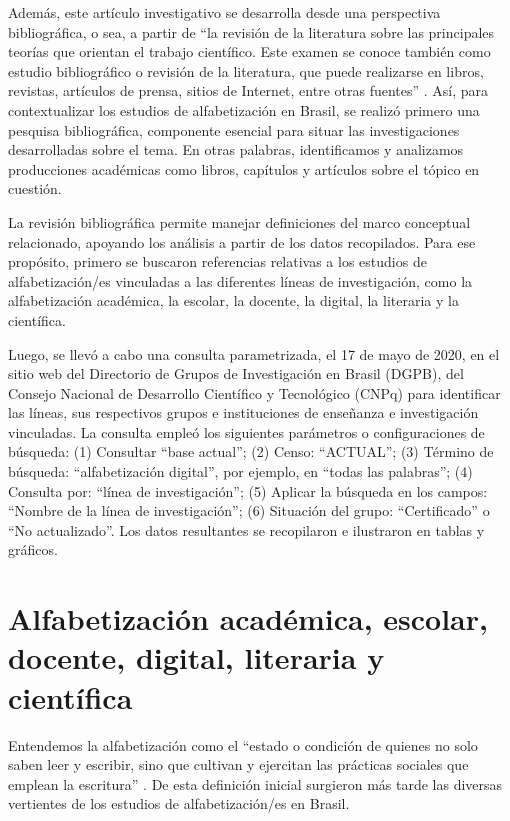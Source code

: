 \documentclass[spanish]{textolivre}
\begin{document}
Además, este artículo investigativo se desarrolla desde una perspectiva bibliográfica, o sea, a partir de “la revisión de la literatura sobre las principales teorías que orientan el trabajo científico. Este examen se conoce también como estudio bibliográfico o revisión de la literatura, que puede realizarse en libros, revistas, artículos de prensa, sitios de Internet, entre otras fuentes” \cite[p. 54]{pizzani_arte_2012}. Así, para contextualizar los estudios de alfabetización en Brasil, se realizó primero una pesquisa bibliográfica, componente esencial para situar las investigaciones desarrolladas sobre el tema. En otras palabras, identificamos y analizamos producciones académicas como libros, capítulos y artículos sobre el tópico en cuestión.

La revisión bibliográfica permite manejar definiciones del marco conceptual relacionado, apoyando los análisis a partir de los datos recopilados. Para ese propósito, primero se buscaron referencias relativas a los estudios de alfabetización/es vinculadas a las diferentes líneas de investigación, como la alfabetización académica, la escolar, la docente, la digital, la literaria y la científica.

Luego, se llevó a cabo una consulta parametrizada, el 17 de mayo de 2020, en el sitio web del Directorio de Grupos de Investigación en Brasil (DGPB), del Consejo Nacional de Desarrollo Científico y Tecnológico (CNPq) para identificar las líneas, sus respectivos grupos e instituciones de enseñanza e investigación vinculadas. La consulta empleó los siguientes parámetros o configuraciones de búsqueda: (1) Consultar “base actual”; (2) Censo: “ACTUAL”; (3) Término de búsqueda: “alfabetización digital”, por ejemplo, en “todas las palabras”; (4) Consulta por: “línea de investigación”; (5) Aplicar la búsqueda en los campos: “Nombre de la línea de investigación”; (6) Situación del grupo: “Certificado” o “No actualizado”. Los datos resultantes se recopilaron e ilustraron en tablas y gráficos.

\section{Alfabetización académica, escolar, docente, digital, literaria y científica}\label{sec-alfabetizacion}
Entendemos la alfabetización como el “estado o condición de quienes no solo saben leer y escribir, sino que cultivan y ejercitan las prácticas sociales que emplean la escritura” \cite[p. 47]{soares_escolarizacao_1999}. De esta definición inicial surgieron más tarde las diversas vertientes de los estudios de alfabetización/es en Brasil.
\end{document}
